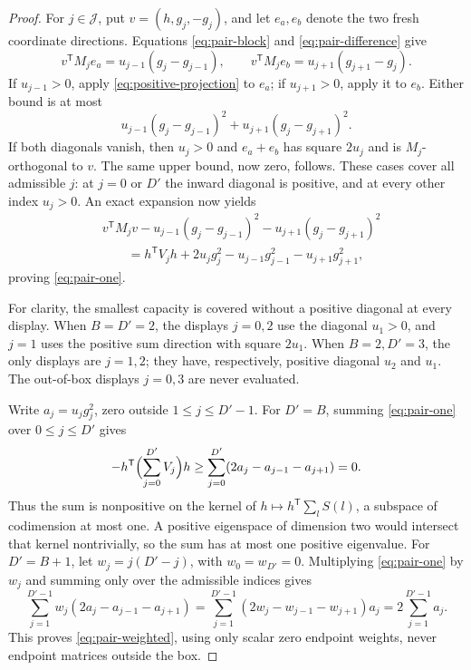 \begin{proof}
For $j\in\mathcal J$, put $v=(h,g_j,-g_j)$, and let $e_a,e_b$ denote
the two fresh coordinate directions.  Equations
\eqref{eq:pair-block} and \eqref{eq:pair-difference} give
\[
 v^{\mathsf T}M_je_a=u_{j-1}(g_j-g_{j-1}),\qquad
 v^{\mathsf T}M_je_b=u_{j+1}(g_{j+1}-g_j).
\]
If $u_{j-1}>0$, apply \eqref{eq:positive-projection} to $e_a$; if
$u_{j+1}>0$, apply it to $e_b$.  Either bound is at most
\[
 u_{j-1}(g_j-g_{j-1})^2+u_{j+1}(g_j-g_{j+1})^2.
\]
If both diagonals vanish, then $u_j>0$ and $e_a+e_b$ has square $2u_j$
and is $M_j$-orthogonal to $v$.  The same upper bound, now zero, follows.
These cases cover all admissible $j$: at $j=0$ or $D'$ the inward
diagonal is positive, and at every other index $u_j>0$.
An exact expansion now yields
\begin{align*}
 &v^{\mathsf T}M_jv
   -u_{j-1}(g_j-g_{j-1})^2-u_{j+1}(g_j-g_{j+1})^2\\
 &\hspace{2em}=h^{\mathsf T}V_jh
                 +2u_jg_j^2-u_{j-1}g_{j-1}^2-u_{j+1}g_{j+1}^2,
\end{align*}
proving \eqref{eq:pair-one}.

For clarity, the smallest capacity is covered without a positive
diagonal at every display.  When $B=D'=2$, the displays $j=0,2$ use
the diagonal $u_1>0$, and $j=1$ uses the positive sum direction with
square $2u_1$.  When $B=2,D'=3$, the only displays are $j=1,2$;
they have, respectively, positive diagonal $u_2$ and $u_1$.
The out-of-box displays $j=0,3$ are never evaluated.

Write $a_j=u_jg_j^2$, zero outside $1\le j\le D'-1$.
For $D'=B$, summing \eqref{eq:pair-one} over $0\le j\le D'$ gives
\[
 -h^{\mathsf T}\Bigl(\sum_{j=0}^{D'}V_j\Bigr)h
 \ge\sum_{j=0}^{D'}(2a_j-a_{j-1}-a_{j+1})=0.
\]
Thus the sum is nonpositive on the kernel of
$h\mapsto h^{\mathsf T}\sum_l S(l)$, a subspace of codimension at most
one.  A positive eigenspace of dimension two would intersect that
kernel nontrivially, so the sum has at most one positive eigenvalue.
For $D'=B+1$, let $w_j=j(D'-j)$, with $w_0=w_{D'}=0$.
Multiplying \eqref{eq:pair-one} by $w_j$ and summing only over the
admissible indices gives
\[
 \sum_{j=1}^{D'-1}w_j(2a_j-a_{j-1}-a_{j+1})
 =\sum_{j=1}^{D'-1}(2w_j-w_{j-1}-w_{j+1})a_j
 =2\sum_{j=1}^{D'-1}a_j.
\]
This proves \eqref{eq:pair-weighted}, using only scalar zero endpoint
weights, never endpoint matrices outside the box.
\end{proof}

